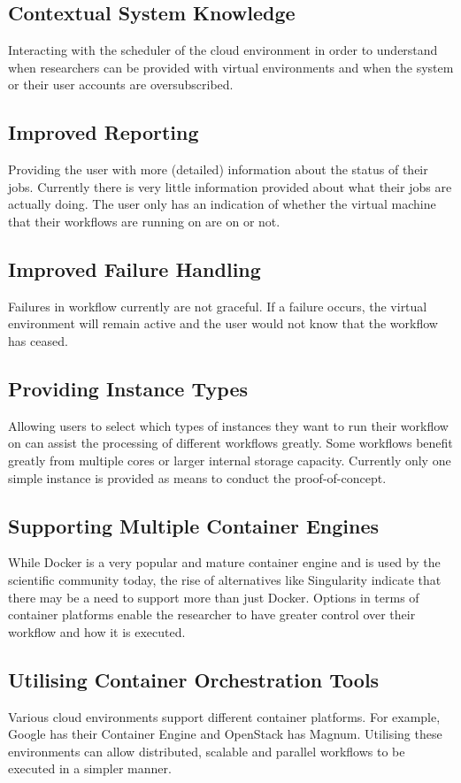 \subsection{Contextual System Knowledge}
Interacting with the scheduler of the cloud environment in order to understand when researchers can be provided with virtual environments and when the system or their user accounts are oversubscribed.

\subsection{Improved Reporting}
Providing the user with more (detailed) information about the status of their jobs. Currently there is very little information provided about what their jobs are actually doing. The user only has an indication of whether the virtual machine that their workflows are running on are on or not.

\subsection{Improved Failure Handling}
Failures in workflow currently are not graceful. If a failure occurs, the virtual environment will remain active and the user would not know that the workflow has ceased.

\subsection{Providing Instance Types}
Allowing users to select which types of instances they want to run their workflow on can assist the processing of different workflows greatly. Some workflows benefit greatly from multiple cores or larger internal storage capacity. Currently only one simple instance is provided as means to conduct the proof-of-concept.

\subsection{Supporting Multiple Container Engines}
While Docker is a very popular and mature container engine and is used by the scientific community today, the rise of alternatives like Singularity indicate that there may be a need to support more than just Docker. Options in terms of container platforms enable the researcher to have greater control over their workflow and how it is executed.

\subsection{Utilising Container Orchestration Tools}
Various cloud environments support different container platforms. For example, Google has their Container Engine and OpenStack has Magnum. Utilising these environments can allow distributed, scalable and parallel workflows to be executed in a simpler manner.

